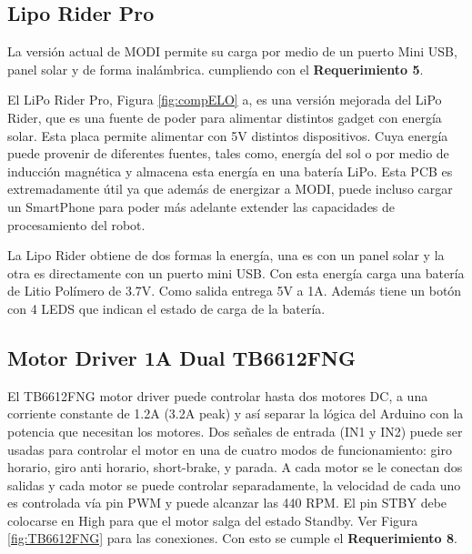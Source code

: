 \subsection{Lipo Rider Pro}
 La versión actual de MODI permite su carga por medio de un puerto Mini USB, panel solar y de forma inalámbrica. cumpliendo con el \textbf{Requerimiento 5}.

El LiPo Rider Pro, Figura \ref{fig:compELO} a, es una versión mejorada del LiPo Rider, que es una fuente de poder para alimentar distintos gadget con energía solar. Esta placa permite alimentar con 5V distintos dispositivos. Cuya energía puede provenir de diferentes fuentes, tales como, energía del sol o por medio de inducción magnética y almacena esta energía en una batería LiPo. Esta PCB es extremadamente útil ya que además de energizar a MODI, puede incluso cargar un SmartPhone para poder más adelante extender las capacidades de procesamiento del robot.

La Lipo Rider obtiene de dos formas la energía, una es con un panel solar y la otra es directamente con un puerto mini USB. Con esta energía carga una batería de Litio Polímero de 3.7V. Como salida entrega 5V a 1A. Además tiene un botón con 4 LEDS que indican el estado de carga de la batería.

\subsection{Motor Driver 1A Dual TB6612FNG}
El TB6612FNG motor driver puede controlar hasta dos motores DC, a una corriente constante de 1.2A (3.2A peak) y así separar la lógica del Arduino con la potencia que necesitan los motores. Dos señales de entrada (IN1 y IN2) puede ser usadas para controlar el motor en una de cuatro modos de funcionamiento: giro horario, giro anti horario, short-brake, y parada. A cada motor se le conectan dos salidas y cada motor se puede controlar separadamente, la velocidad de cada uno es controlada vía pin PWM y puede alcanzar las 440 RPM. El pin STBY debe colocarse en High para que el motor salga del estado Standby. Ver Figura  \ref{fig:TB6612FNG} para las conexiones. Con esto se cumple el \textbf{Requerimiento 8}.

